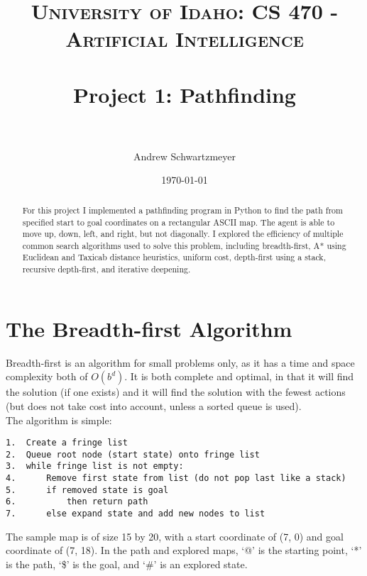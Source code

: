 \documentclass[12pt, article]{scrartcl}
\title{	
\normalfont \normalsize 
\textsc{University of Idaho: CS 470 - Artificial Intelligence} \\ [25pt]
\horrule{0.5pt} \\[0.4cm]
\huge Project 1: Pathfinding\\
\horrule{2pt} \\[0.5cm]
}
\author{Andrew Schwartzmeyer}
\date{\normalsize\today}
\begin{document}
\maketitle %
\begin{abstract}
For this project I implemented a pathfinding program in Python to find the path
from specified start to goal coordinates on a rectangular ASCII map. The agent
is able to move up, down, left, and right, but not diagonally. I explored the
efficiency of multiple common search algorithms used to solve this problem,
including breadth-first, A* using Euclidean and Taxicab distance heuristics,
uniform cost, depth-first using a stack, recursive depth-first, and iterative
deepening.
\end{abstract}
\pagebreak

\section{The Breadth-first Algorithm}
Breadth-first is an algorithm for small problems only, as it has a time and
space complexity both of $O(b^{d})$. It is both complete and optimal, in that it
will find the solution (if one exists) and it will find the solution with the
fewest actions (but does not take cost into account, unless a sorted queue is
used).\\

The algorithm is simple: 
\begin{verbatim}
1.  Create a fringe list
2.  Queue root node (start state) onto fringe list
3.  while fringe list is not empty:
4.      Remove first state from list (do not pop last like a stack)
5.      if removed state is goal
6.          then return path
7.      else expand state and add new nodes to list
\end{verbatim}

The sample map is of size 15 by 20, with a start coordinate of (7, 0) and
goal coordinate of (7, 18). In the path and explored maps, `@' is the starting
point, `*' is the path, `\$' is the goal, and `\#' is an explored state. \\
\end{document}
